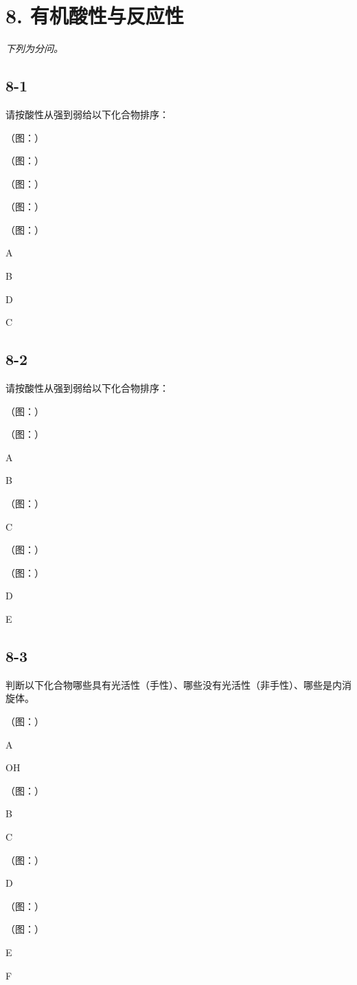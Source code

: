 \section*{8. 有机酸性与反应性}
\textit{下列为分问。}

\subsection*{8-1}
请按酸性从强到弱给以下化合物排序：

（图：）

（图：）

（图：）

（图：）

（图：）

A

B

D

C

\subsection*{8-2}
请按酸性从强到弱给以下化合物排序：

（图：）

（图：）

A

B

（图：）

C

（图：）

（图：）

D

E

\subsection*{8-3}
判断以下化合物哪些具有光活性（⼿性）、哪些没有光活性（⾮⼿性）、哪些是内消旋体。

（图：）

A

OH

（图：）

B

C

（图：）

D

（图：）

（图：）

E

F
